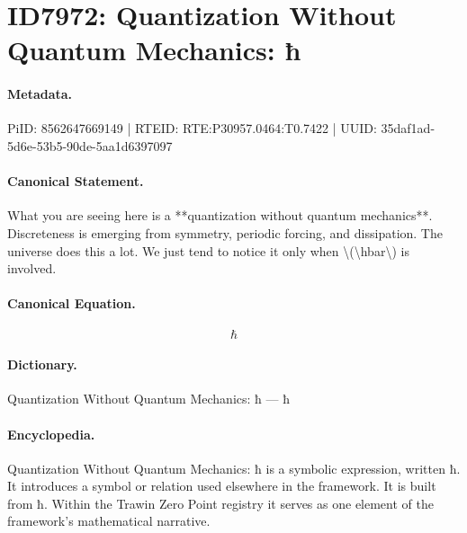 \section*{ID7972: Quantization Without Quantum Mechanics: ħ}
\paragraph{Metadata.}
PiID: 8562647669149 | RTEID: RTE:P30957.0464:T0.7422 | UUID: 35daf1ad-5d6e-53b5-90de-5aa1d6397097

\paragraph{Canonical Statement.}
What you are seeing here is a **quantization without quantum mechanics**. Discreteness is emerging from symmetry, periodic forcing, and dissipation. The universe does this a lot. We just tend to notice it only when \textbackslash{}(\textbackslash{}hbar\textbackslash{}) is involved.

\paragraph{Canonical Equation.}
\[
\hbar
\]

\paragraph{Dictionary.}
Quantization Without Quantum Mechanics: ħ — ħ

\paragraph{Encyclopedia.}
Quantization Without Quantum Mechanics: ħ is a symbolic expression, written ħ. It introduces a symbol or relation used elsewhere in the framework. It is built from ħ. Within the Trawin Zero Point registry it serves as one element of the framework's mathematical narrative.
